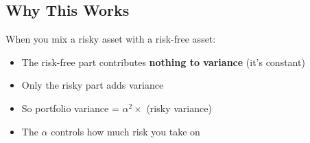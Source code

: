 \documentclass[12pt]{article}
\begin{document}
\subsection*{\large Why This Works}

When you mix a risky asset with a risk-free asset:
\begin{itemize}[leftmargin=2cm]
    \item The risk-free part contributes \textbf{nothing to variance} (it's constant)
    \item Only the risky part adds variance
    \item So portfolio variance = $\alpha^2 \times$ (risky variance)
    \item The $\alpha$ controls how much risk you take on
\end{itemize}
\end{document}
